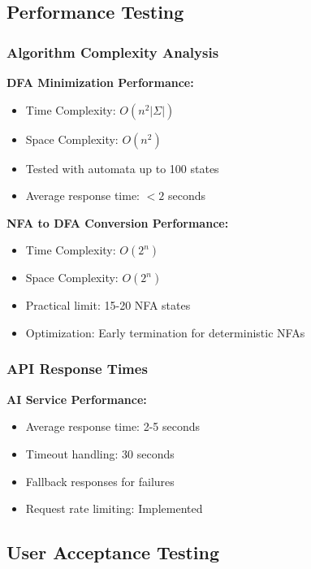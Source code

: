 \documentclass[12pt]{article}
\begin{document}
\subsection{Performance Testing}

\subsubsection{Algorithm Complexity Analysis}
\textbf{DFA Minimization Performance:}
\begin{itemize}
    \item Time Complexity: $O(n^2|\Sigma|)$
    \item Space Complexity: $O(n^2)$
    \item Tested with automata up to 100 states
    \item Average response time: $<2$ seconds
\end{itemize}
\textbf{NFA to DFA Conversion Performance:}
\begin{itemize}
    \item Time Complexity: $O(2^n)$
    \item Space Complexity: $O(2^n)$
    \item Practical limit: 15-20 NFA states
    \item Optimization: Early termination for deterministic NFAs
\end{itemize}

\subsubsection{API Response Times}
\textbf{AI Service Performance:}
\begin{itemize}
    \item Average response time: 2-5 seconds
    \item Timeout handling: 30 seconds
    \item Fallback responses for failures
    \item Request rate limiting: Implemented
\end{itemize}

\subsection{User Acceptance Testing}
\end{document}
